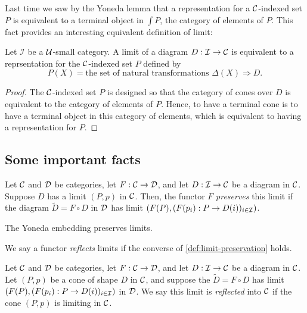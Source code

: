 Last time we saw by the Yoneda lemma that a representation for a \(\mathcal C\)-indexed set \(P\)
is equivalent to a terminal object in \(\int P\), the category of elements of \(P\).
This fact provides an interesting equivalent definition of limit:
\begin{proposition}
  Let \(\mathcal I\) be a \(\mathcal U\)-small category.
  A limit of a diagram \(D : \mathcal I \to \mathcal C\)
  is equivalent to a reprsentation for the \(\mathcal C\)-indexed set \(P\) defined by
  \[
     P(X) = \text{the set of natural transformations }\Delta(X) \Rightarrow D.
  \]
\end{proposition}
\begin{proof}
  The \(\mathcal C\)-indexed set \(P\) is designed so that
  the category of cones over \(D\) is equivalent to the category of elements of \(P\).
  Hence, to have a terminal cone is to have a terminal object in this category of elements,
which is equivalent to having a representation for \(P\).
\end{proof}


\subsection{Some important facts}

\begin{definition} \label{def:limit-preservation}
  \sloppy
  Let $\mathcal C$ and $\mathcal D$ be categories, let $F : \mathcal C \to \mathcal D$,
  and let $D : \mathcal I \to \mathcal C$ 
  be a diagram in $\mathcal C$. 
  Suppose $D$ has a limit $(P,p)$ in $\mathcal C$. Then,
  the functor $F$ \emph{preserves} this limit
  if
  the diagram $\tilde{D} = F \circ D$ in $\mathcal D$
  has limit
  $(F(P), (F(p_i) : P \to D(i))_{i\in \mathcal I})$.
\end{definition}

\begin{proposition}
  The Yoneda embedding preserves limits.
\end{proposition}

We say a functor \emph{reflects} limits if the converse of \cref{def:limit-preservation} holds.

\begin{definition}
  \sloppy
  Let $\mathcal C$ and $\mathcal D$ be categories, let $F : \mathcal C \to \mathcal D$,
  and let $D : \mathcal I \to \mathcal C$
  be a diagram in $\mathcal C$.
  Let \((P,p)\) be a cone of shape \(D\) in \(\mathcal C\),
  and suppose the $\tilde{D} = F \circ D$
  has limit $(F(P), (F(p_i) : P \to D(i))_{i\in \mathcal I})$ in \(\mathcal D\).
  We say this limit is \emph{reflected} into \(\mathcal C\)
  if the cone $(P,p)$ is limiting in $\mathcal C$.
\end{definition}


